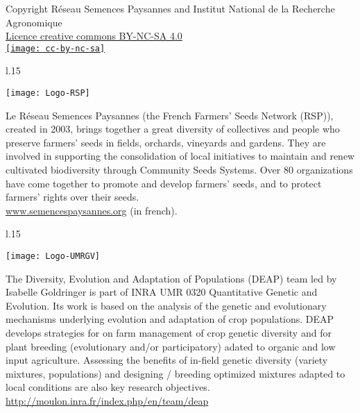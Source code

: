 \vfill

\begin{center}
Copyright Réseau Semences Paysannes and Institut National de la Recherche Agronomique \\
\href{http://creativecommons.org/licenses/by-nc-sa/4.0/}{Licence creative commons BY-NC-SA 4.0} \\
\vspace{.25cm}
\href{http://creativecommons.org/licenses/by-nc-sa/4.0/}{\texttt{[image: cc-by-nc-sa]}}
\end{center}

\vfill

\begin{wrapfigure}{l}{.15\textwidth}
\begin{center} \vspace{-20pt}
\texttt{[image: Logo-RSP]}
\end{center} \vspace{-20pt}
\end{wrapfigure}
\noindent
Le Réseau Semences Paysannes (the French Farmers' Seeds Network (RSP)), created in 2003, brings together a great diversity of collectives and people who preserve farmers' seeds in fields, orchards, vineyards and gardens. They are involved in supporting the consolidation of local initiatives to maintain and renew cultivated biodiversity through Community Seeds Systems. Over 80 organizations have come together to promote and develop farmers' seeds, and to protect farmers' rights over their seeds. \\
\url{www.semencespaysannes.org} (in french).


\vfill

\begin{wrapfigure}{l}{.15\textwidth}
\begin{center} \vspace{-20pt}
\texttt{[image: Logo-UMRGV]}
\end{center} \vspace{-20pt}
\end{wrapfigure}
\noindent
The Diversity, Evolution and Adaptation of Populations (DEAP) team led by Isabelle Goldringer is part of INRA UMR 0320 Quantitative Genetic and Evolution.
Its work is based on the analysis of the genetic and evolutionary mechanisms underlying evolution and adaptation of crop populations.
DEAP develops strategies for on farm management of crop genetic diversity and
for plant breeding (evolutionary and/or participatory) adated to organic and low input agriculture.
Assessing the benefits of in-field genetic diversity (variety mixtures, populations) and designing
/ breeding optimized mixtures adapted to local conditions are also key research objectives.\\
\url{http://moulon.inra.fr/index.php/en/team/deap}


